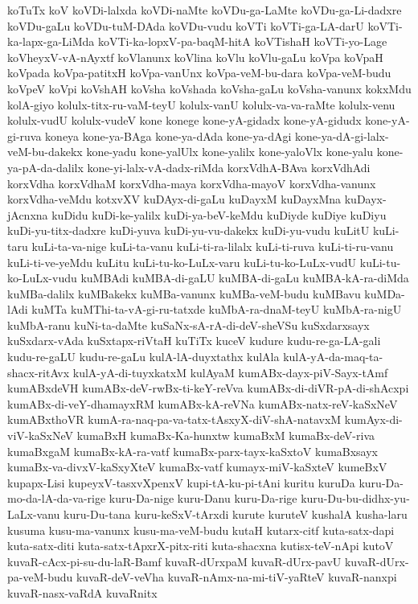 {koTuTx
koV
koVDi-lalxda
koVDi-naMte
koVDu-ga-LaMte
koVDu-ga-Li-dadxre
koVDu-gaLu
koVDu-tuM-DAda
koVDu-vudu
koVTi
koVTi-ga-LA-darU
koVTi-ka-lapx-ga-LiMda
koVTi-ka-lopxV-pa-baqM-hitA
koVTishaH
koVTi-yo-Lage
koVheyxV-vA-nAyxtf
koVlanunx
koVlina
koVlu
koVlu-gaLu
koVpa
koVpaH
koVpada
koVpa-patitxH
koVpa-vanUnx
koVpa-veM-bu-dara
koVpa-veM-budu
koVpeV
koVpi
koVshAH
koVsha
koVshada
koVsha-gaLu
koVsha-vanunx
kokxMdu
kolA-giyo
kolulx-titx-ru-vaM-teyU
kolulx-vanU
kolulx-va-va-raMte
kolulx-venu
kolulx-vudU
kolulx-vudeV
kone
konege
kone-yA-gidadx
kone-yA-gidudx
kone-yA-gi-ruva
koneya
kone-ya-BAga
kone-ya-dAda
kone-ya-dAgi
kone-ya-dA-gi-lalx-veM-bu-dakekx
kone-yadu
kone-yalUlx
kone-yalilx
kone-yaloVlx
kone-yalu
kone-ya-pA-da-dalilx
kone-yi-lalx-vA-dadx-riMda
korxVdhA-BAva
korxVdhAdi
korxVdha
korxVdhaM
korxVdha-maya
korxVdha-mayoV
korxVdha-vanunx
korxVdha-veMdu
kotxvXV
kuDAyx-di-gaLu
kuDayxM
kuDayxMna
kuDayx-jAcnxna
kuDidu
kuDi-ke-yalilx
kuDi-ya-beV-keMdu
kuDiyde
kuDiye
kuDiyu
kuDi-yu-titx-dadxre
kuDi-yuva
kuDi-yu-vu-dakekx
kuDi-yu-vudu
kuLitU
kuLi-taru
kuLi-ta-va-nige
kuLi-ta-vanu
kuLi-ti-ra-lilalx
kuLi-ti-ruva
kuLi-ti-ru-vanu
kuLi-ti-ve-yeMdu
kuLitu
kuLi-tu-ko-LuLx-varu
kuLi-tu-ko-LuLx-vudU
kuLi-tu-ko-LuLx-vudu
kuMBAdi
kuMBA-di-gaLU
kuMBA-di-gaLu
kuMBA-kA-ra-diMda
kuMBa-dalilx
kuMBakekx
kuMBa-vanunx
kuMBa-veM-budu
kuMBavu
kuMDa-lAdi
kuMTa
kuMThi-ta-vA-gi-ru-tatxde
kuMbA-ra-dnaM-teyU
kuMbA-ra-nigU
kuMbA-ranu
kuNi-ta-daMte
kuSaNx-sA-rA-di-deV-sheVSu
kuSxdarxsayx
kuSxdarx-vAda
kuSxtapx-riVtaH
kuTiTx
kuceV
kudure
kudu-re-ga-LA-gali
kudu-re-gaLU
kudu-re-gaLu
kulA-lA-duyxtathx
kulAla
kulA-yA-da-maq-ta-shacx-ritAvx
kulA-yA-di-tuyxkatxM
kulAyaM
kumABx-dayx-piV-Sayx-tAmf
kumABxdeVH
kumABx-deV-rwBx-ti-keY-reVva
kumABx-di-diVR-pA-di-shAcxpi
kumABx-di-veY-dhamayxRM
kumABx-kA-reVNa
kumABx-natx-reV-kaSxNeV
kumABxthoVR
kumA-ra-naq-pa-va-tatx-tAsxyX-diV-shA-natavxM
kumAyx-di-viV-kaSxNeV
kumaBxH
kumaBx-Ka-hunxtw
kumaBxM
kumaBx-deV-riva
kumaBxgaM
kumaBx-kA-ra-vatf
kumaBx-parx-tayx-kaSxtoV
kumaBxsayx
kumaBx-va-divxV-kaSxyXteV
kumaBx-vatf
kumayx-miV-kaSxteV
kumeBxV
kupapx-Lisi
kupeyxV-tasxvXpenxV
kupi-tA-ku-pi-tAni
kuritu
kuruDa
kuru-Da-mo-da-lA-da-va-rige
kuru-Da-nige
kuru-Danu
kuru-Da-rige
kuru-Du-bu-didhx-yu-LaLx-vanu
kuru-Du-tana
kuru-keSxV-tArxdi
kurute
kuruteV
kushalA
kusha-laru
kusuma
kusu-ma-vanunx
kusu-ma-veM-budu
kutaH
kutarx-citf
kuta-satx-dapi
kuta-satx-diti
kuta-satx-tApxrX-pitx-riti
kuta-shacxna
kutisx-teV-nApi
kutoV
kuvaR-cAcx-pi-su-du-laR-Bamf
kuvaR-dUrxpaM
kuvaR-dUrx-pavU
kuvaR-dUrx-pa-veM-budu
kuvaR-deV-veVha
kuvaR-nAmx-na-mi-tiV-yaRteV
kuvaR-nanxpi
kuvaR-nasx-vaRdA
kuvaRnitx
}
